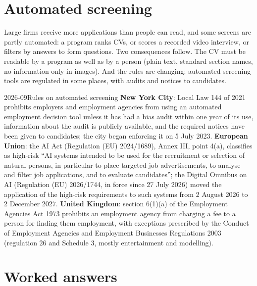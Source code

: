 \section{Automated screening}

Large firms receive more applications than people can read, and some screens are partly automated: a program
ranks CVs, or scores a recorded video interview, or filters by answers to form questions. Two consequences
follow. The CV must be readable by a program as well as by a person (plain text, standard section names, no
information only in images). And the rules are changing: automated screening tools are regulated in some
places, with audits and notices to candidates.

\begin{dated}{2026-09}{Rules on automated screening}\label{dat:iv:applications:law}
\textbf{New York City}: Local Law 144 of 2021 prohibits employers and employment agencies from using an
automated employment decision tool unless it has had a bias audit within one year of its use, information
about the audit is publicly available, and the required notices have been given to candidates; the city began
enforcing it on 5 July 2023. \textbf{European Union}: the AI Act (Regulation (EU) 2024/1689), Annex III,
point 4(a), classifies as high-risk ``AI systems intended to be used for the recruitment or selection of
natural persons, in particular to place targeted job advertisements, to analyse and filter job applications,
and to evaluate candidates''; the Digital Omnibus on AI (Regulation (EU) 2026/1744, in force since 27 July
2026) moved the application of the high-risk requirements to such systems from 2 August 2026 to 2 December
2027. \textbf{United Kingdom}: section 6(1)(a) of the Employment Agencies Act 1973 prohibits an employment
agency from charging a fee to a person for finding them employment, with exceptions prescribed by the
Conduct of Employment Agencies and Employment Businesses Regulations 2003 (regulation 26 and Schedule 3,
mostly entertainment and modelling).
\end{dated}

\section{Worked answers}

